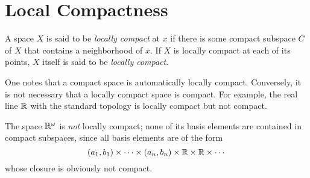 \section{Local Compactness}
\begin{definition}
    A space $X$ is said to be \textit{locally compact} at $x$ if there is some compact subspace $C$ of $X$ that contains a neighborhood of $x$. If $X$ is locally compact at each of its points, $X$ itself is said to be \textit{locally compact}.
\end{definition}

One notes that a compact space is automatically locally compact. Conversely, it is not necessary that a locally compact space is compact. For example, the real line $\mathbb{R}$ with the standard topology is locally compact but not compact.

The space $\mathbb{R}^\omega$ is \textit{not} locally compact; none of its basis elements are contained in compact subspaces, since all basis elements are of the form 
\begin{equation*}
    (a_1, b_1)\times\cdots\times(a_n,b_n)\times\mathbb{R}\times\mathbb{R}\times\cdots
\end{equation*}
whose closure is obviously not compact.

